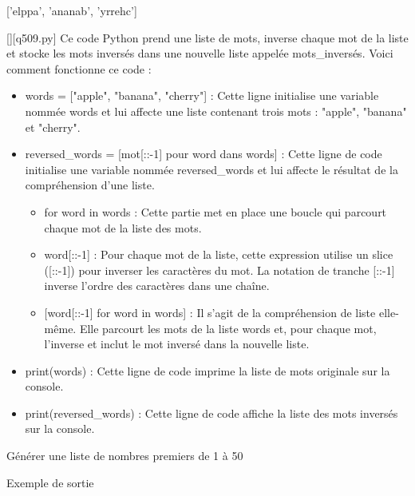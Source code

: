 ['elppa', 'ananab', 'yrrehc']
        \par
        \begin{solution}
            \renewcommand{\nomfichier}{q509.py}
            \pythonfile{\chemincode \nomfichier}[][\nomfichier]
            Ce code Python prend une liste de mots, inverse chaque mot de la liste et stocke les mots inversés dans une nouvelle liste appelée mots\_inversés. Voici comment fonctionne ce code :
\begin{itemize}
	\item     words = ["apple", "banana", "cherry"] : Cette ligne initialise une variable nommée words et lui affecte une liste contenant trois mots : "apple", "banana" et "cherry".
	\item     reversed\_words = [mot[::-1] pour word dans words] : Cette ligne de code initialise une variable nommée reversed\_words et lui affecte le résultat de la compréhension d'une liste.

      \begin{itemize}
      	\item   for word in words : Cette partie met en place une boucle qui parcourt chaque mot de la liste des mots.
      	\item         word[::-1] : Pour chaque mot de la liste, cette expression utilise un slice ([::-1]) pour inverser les caractères du mot. La notation de tranche [::-1] inverse l'ordre des caractères dans une chaîne.
      	\item{}         [word[::-1] for word in words] : Il s'agit de la compréhension de  liste elle-même. Elle parcourt les mots de la liste words et, pour chaque mot, l'inverse et inclut le mot inversé dans la nouvelle liste.
      \end{itemize}
    \item print(words) : Cette ligne de code imprime la liste de mots originale sur la console.
    \item print(reversed\_words) : Cette ligne de code affiche la liste des mots inversés sur la console.
    \end{itemize}
        \end{solution}
        

        \question
        Générer une liste de nombres premiers de 1 à 50

Exemple de sortie

